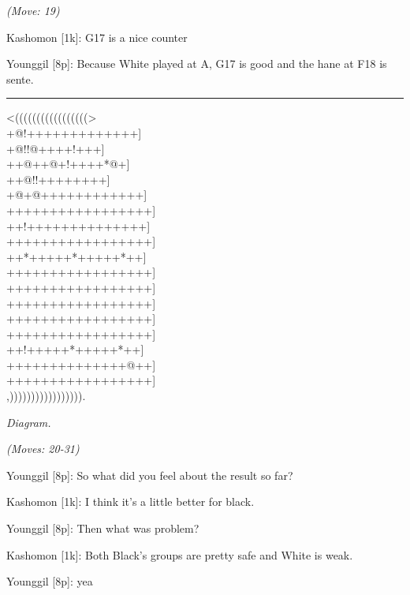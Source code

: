\documentclass[letterpaper,12pt]{memoir}
\newcounter{GoFigure}[part]
\newcommand{\gofigure}{%
 \stepcounter{GoFigure}
 \centerline{\textit{Diagram.\thinspace\arabic{GoFigure}}}
}
\newcommand{\subtext}[1]{\centerline{\textit{#1}}}
\begin{document}
\subtext{(Move: 19)}

Kashomon [1k]: G17 is a nice counter

Younggil [8p]: Because White played at A, G17 is good and the hane at F18 is sente.


\vfill

\rule{\textwidth}{0.5pt}

\begin{minipage}[t]{0.5\textwidth}
{\gnos
<(((((((((((((((((>\\
+@!+++++++++++++]\\
+@!!@++++!+++]\\
++@++@+!++++*@+]\\
++@!!++++++++]\\
+@+@++++++++++++]\\
+++++++++++++++++]\\
++!++++++++++++++]\\
+++++++++++++++++]\\
++*+++++*+++++*++]\\
+++++++++++++++++]\\
+++++++++++++++++]\\
+++++++++++++++++]\\
+++++++++++++++++]\\
+++++++++++++++++]\\
++!+++++*+++++*++]\\
++++++++++++++@++]\\
+++++++++++++++++]\\
,))))))))))))))))).\\
}
\gofigure

\subtext{(Moves: 20-31)}
\end{minipage}
\begin{minipage}[t]{0.5\textwidth}
\setlength{\parskip}{0.5em}
Younggil [8p]: So what did you feel about the result so far?

Kashomon [1k]: I think it's a little better for black.

Younggil [8p]: Then what was problem?

Kashomon [1k]: Both Black's groups are pretty safe and White is weak.

Younggil [8p]: yea


\end{minipage}
\vfill
\end{document}
